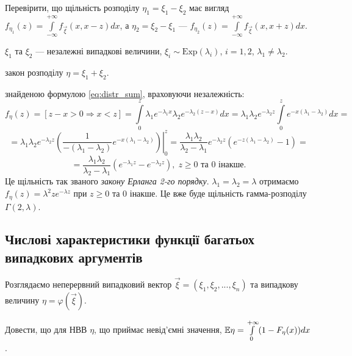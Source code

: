 \begin{exercise}
    Перевірити, що щільність розподілу $\eta_1 = \xi_1 - \xi_2$ має вигляд
    $f_{\eta_1}(z) = \int\limits_{-\infty}^{+\infty} f_{\vec{\xi}}(x, x-z) dx$, а 
    $\eta_2 = \xi_2 - \xi_1$ --- $f_{\eta_2}(z) = \int\limits_{-\infty}^{+\infty} f_{\vec{\xi}}(x, x+z) dx$.
\end{exercise}

\begin{example}
    $\xi_1$ та $\xi_2$ --- незалежні випадкові величини, $\xi_i \sim \mathrm{Exp}(\lambda_i)$, 
    $i = 1,2$, $\lambda_1 \neq \lambda_2$.

     закон розподілу $\eta = \xi_1 + \xi_2$.

     знайденою формулою \eqref{eq:distr_sum}, враховуючи незалежність:
    \begin{equation*}
        f_\eta(z) = \left[z - x > 0 \Rightarrow x < z\right] = 
        \int\limits_0^z \lambda_1 e^{-\lambda_1 x}\lambda_2e^{-\lambda_2(z-x)}dx
        =
        \lambda_1\lambda_2e^{-\lambda_2z}\int\limits_0^z e^{-x(\lambda_1 - \lambda_2)} dx=
    \end{equation*}
    \begin{equation*}
        =\lambda_1\lambda_2e^{-\lambda_2z}
        \left.
        \left(\frac{1}{-(\lambda_1 - \lambda_2)} e^{-x(\lambda_1 - \lambda_2)}\right)
        \right|_0^z = 
        \frac{\lambda_1\lambda_2}{\lambda_2 - \lambda_1}e^{-\lambda_2z}
        (e^{-z(\lambda_1 - \lambda_2)} - 1) =
    \end{equation*}
    \begin{equation*}
        = \frac{\lambda_1\lambda_2}{\lambda_2 - \lambda_1}(e^{-\lambda_1 z} - e^{-\lambda_2 z})
        ,\; z \geq 0 \text{ та } 0 \text{ інакше.}
    \end{equation*}
Це щільність так званого \emph{закону Ерланга 2-го порядку}.
 $\lambda_1 = \lambda_2 = \lambda$ отримаємо
$f_{\eta}(z) = \lambda^2 z e^{-\lambda z}$ при $z \geq 0$ та $0$ інакше.
Це вже буде щільність гамма-розподілу $\Gamma(2, \lambda)$.
\end{example}

\subsection{Числові характеристики функції багатьох випадкових аргументів}
Розглядаємо неперервний випадковий вектор $\vec{\xi} = (\xi_1, \xi_2, ..., \xi_n)$ та
випадкову величину $\eta = \varphi(\vec{\xi})$.
\begin{exercise}
    Довести, що для НВВ $\eta$, що приймає невід'ємні значення, $\mathbb{E}\eta = \int\limits_0^{+\infty} (1 - F_{\eta}(x)) dx$.
\end{exercise}

